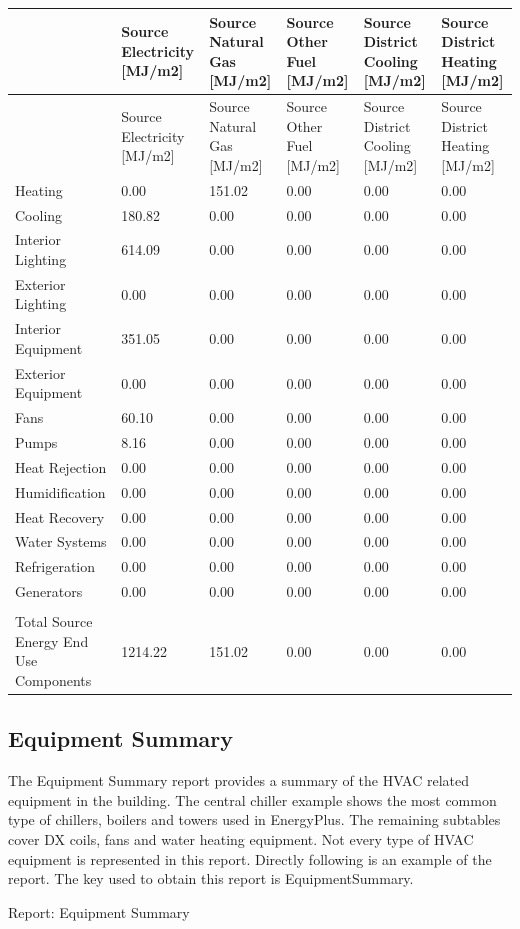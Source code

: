 \begin{longtable}[c]{>{\raggedright}p{1.0in}>{\raggedright}p{1.0in}>{\raggedright}p{1.0in}>{\raggedright}p{1.0in}>{\raggedright}p{1.0in}>{\raggedright}p{1.0in}}
\toprule
 & Source Electricity [MJ/m2] & Source Natural Gas [MJ/m2] & Source Other Fuel [MJ/m2] & Source District Cooling [MJ/m2] & Source District Heating [MJ/m2] \tabularnewline
\midrule
\endfirsthead

\toprule
 & Source Electricity [MJ/m2] & Source Natural Gas [MJ/m2] & Source Other Fuel [MJ/m2] & Source District Cooling [MJ/m2] & Source District Heating [MJ/m2] \tabularnewline
\midrule
\endhead

Heating & 0.00 & 151.02 & 0.00 & 0.00 & 0.00 \tabularnewline
Cooling & 180.82 & 0.00 & 0.00 & 0.00 & 0.00 \tabularnewline
Interior Lighting & 614.09 & 0.00 & 0.00 & 0.00 & 0.00 \tabularnewline
Exterior Lighting & 0.00 & 0.00 & 0.00 & 0.00 & 0.00 \tabularnewline
Interior Equipment & 351.05 & 0.00 & 0.00 & 0.00 & 0.00 \tabularnewline
Exterior Equipment & 0.00 & 0.00 & 0.00 & 0.00 & 0.00 \tabularnewline
Fans & 60.10 & 0.00 & 0.00 & 0.00 & 0.00 \tabularnewline
Pumps & 8.16 & 0.00 & 0.00 & 0.00 & 0.00 \tabularnewline
Heat Rejection & 0.00 & 0.00 & 0.00 & 0.00 & 0.00 \tabularnewline
Humidification & 0.00 & 0.00 & 0.00 & 0.00 & 0.00 \tabularnewline
Heat Recovery & 0.00 & 0.00 & 0.00 & 0.00 & 0.00 \tabularnewline
Water Systems & 0.00 & 0.00 & 0.00 & 0.00 & 0.00 \tabularnewline
Refrigeration & 0.00 & 0.00 & 0.00 & 0.00 & 0.00 \tabularnewline
Generators & 0.00 & 0.00 & 0.00 & 0.00 & 0.00 \tabularnewline
 &  &  &  &  &  \tabularnewline
Total Source Energy End Use Components & 1214.22 & 151.02 & 0.00 & 0.00 & 0.00 \tabularnewline
\bottomrule
\end{longtable}

\subsection{Equipment Summary}\label{equipment-summary}

The Equipment Summary report provides a summary of the HVAC related equipment in the building. The central chiller example shows the most common type of chillers, boilers and towers used in EnergyPlus. The remaining subtables cover DX coils, fans and water heating equipment. Not every type of HVAC equipment is represented in this report. Directly following is an example of the report. The key used to obtain this report is EquipmentSummary.

Report: Equipment Summary

